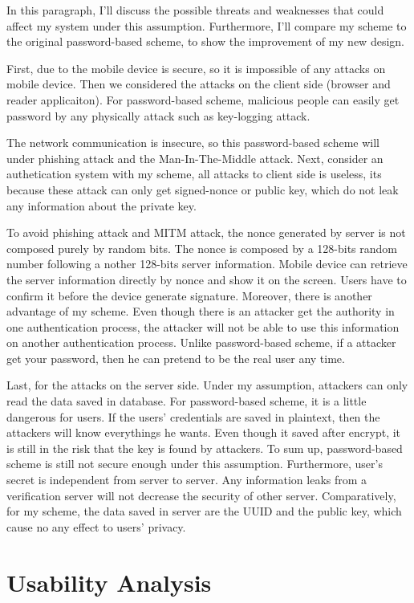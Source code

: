 \begin{CJK}{Bg5}{bsmi}
In this paragraph, I'll discuss the possible threats and weaknesses that could affect my system under this assumption. Furthermore, I'll compare my scheme to the original password-based scheme, to show the improvement of my new design.

First, due to the mobile device is secure, so it is impossible of any attacks on mobile device. Then we considered the attacks on the client side (browser and reader applicaiton). For password-based scheme, malicious people can easily get password by any physically attack such as key-logging attack. 

The network communication is insecure, so this password-based scheme will under phishing attack and the Man-In-The-Middle attack. Next, consider an authetication system with my scheme, all attacks to client side is useless, its because these attack can only get signed-nonce or public key, which do not leak any information about the private key. 

To avoid phishing attack and MITM attack, the nonce generated by server is not composed purely by random bits. The nonce is composed by a 128-bits random number following a nother 128-bits server information. Mobile device can retrieve the server information directly by nonce and show it on the screen. Users have to confirm it before the device generate signature. Moreover, there is another advantage of my scheme. Even though there is an attacker get the authority in one authentication process, the attacker will not be able to use this information on another authentication process. Unlike password-based scheme, if a attacker get your password, then he can pretend to be the real user any time.

Last, for the attacks on the server side. Under my assumption, attackers can only read the data saved in database. For password-based scheme, it is a little dangerous for users. If the users' credentials are saved in plaintext, then the attackers will know everythings he wants. Even though it saved after encrypt, it is still in the risk that the key is found by attackers. To sum up, password-based scheme is still not secure enough under this assumption. Furthermore, user's secret is independent from server to server. Any information leaks from a verification server will not decrease the security of other server. Comparatively, for my scheme, the data saved in server are the UUID and the public key, which cause no any effect to users' privacy.

\section{Usability Analysis}


\end{CJK}

